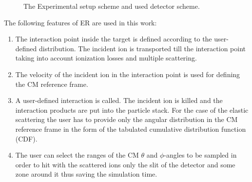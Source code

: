 \documentclass[%
 aip,
cp,  %
 amsmath,amssymb,%
 reprint,%
]{revtex4-2}
\begin{document}
 

\begin{figure}[h]
\caption{The Experimental setup scheme and used detector scheme.}
\label{ris:fig1}
\end{figure}


The following features of ER are used in this work:
\begin{enumerate}
\item The interaction point inside the target is defined according to the user-defined distribution. The incident ion is transported till the interaction point taking into account ionization losses and multiple scattering.
\item The velocity of the incident ion in the interaction point is used for defining the CM reference frame.
\item A user-defined interaction is called. The incident ion is killed and the interaction products are put into the particle stack. For the case of the elastic scattering the user has to provide only the angular distribution in the CM reference frame in the form of the tabulated cumulative distribution function (CDF).
\item The user can select the ranges of the CM $\theta$ and $\phi$-angles to be sampled in order to hit with the scattered ions only the slit of the detector and some zone around it thus saving the simulation time. 
\end{enumerate}
\end{document}
